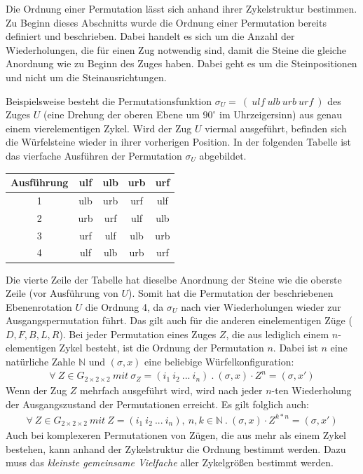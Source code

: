 \documentclass[12pt,a4paper, usenames, dvipsnames]{article}
\theoremstyle{mystyle}
\theoremstyle{definition}
\newcommand{\Gtwo}{\ensuremath{G_{2\times 2\times 2}}}
\begin{document}
Die Ordnung einer Permutation lässt sich anhand ihrer Zykelstruktur bestimmen. Zu Beginn dieses Abschnitts wurde die Ordnung einer Permutation bereits definiert und beschrieben. Dabei handelt es sich um die Anzahl der Wiederholungen, die für einen Zug notwendig sind, damit die Steine die gleiche Anordnung wie zu Beginn des Zuges haben. Dabei geht es um die Steinpositionen und nicht um die Steinausrichtungen.

Beispielsweise besteht die Permutationsfunktion $\sigma_U =\ ( \ \textit{ulf} \ \textit{ulb} \ \textit{urb} \ \textit{urf} \ ) $  des Zuges $U$ (eine Drehung der oberen Ebene um $90^\circ$ im Uhrzeigersinn) aus genau einem vierelementigen Zykel.
Wird der Zug $U$ viermal ausgeführt, befinden sich die Würfelsteine wieder in ihrer vorherigen Position. In der folgenden Tabelle ist das vierfache Ausführen der Permutation $\sigma_U$ abgebildet.
\begin{center}
\begin{tabular}{ccccc}
\toprule
\textbf{Ausführung} & \textbf{ulf} & \textbf{ulb} & \textbf{urb} & \textbf{urf} \\
\midrule
1 & ulb & urb & urf & ulf \\

2 & urb & urf & ulf & ulb \\

3 & urf & ulf & ulb & urb \\

4 & ulf & ulb & urb & urf \\
\bottomrule
\end{tabular}
\end{center}

Die vierte Zeile der Tabelle hat dieselbe Anordnung der Steine wie die oberste Zeile (vor Ausführung von $U$). 
Somit hat die Permutation der beschriebenen Ebenenrotation $U$ die Ordnung 4, da $\sigma_U$ nach vier Wiederholungen wieder zur Ausgangspermutation führt. Das gilt auch für die anderen einelementigen Züge ($D, F, B, L, R$).
Bei jeder Permutation eines Zuges $Z$, die aus lediglich einem $n$-elementigen Zykel besteht, ist die Ordnung der Permutation $n$. Dabei ist $n$ eine natürliche Zahle $\mathbb{N}$ und $(\sigma, x)$ eine beliebige Würfelkonfiguration:
\begin{align*}
\forall \ Z \in \Gtwo \ \textit{mit} \ \sigma_Z=(i_1 \ i_2 \ ... \ i_n) \ . \  (\sigma, x) \cdot Z^n= (\sigma, x')
\end{align*}
Wenn der Zug $Z$ mehrfach ausgeführt wird, wird nach jeder $n$-ten Wiederholung der Ausgangszustand der Permutationen erreicht. \cite{TD} 
Es gilt folglich auch:
\begin{align*}
\forall \ Z \in \Gtwo \ \textit{mit} \ Z=(i_1 \ i_2 \ ... \ i_n), \ n,k \in \mathbb{N} \ . \  {(\sigma, x) \cdot Z^{k*n}=(\sigma, x') }
\end{align*}
Auch bei komplexeren Permutationen von Zügen, die aus mehr als einem Zykel bestehen, kann anhand der Zykelstruktur die Ordnung bestimmt werden. Dazu muss das \textit{kleinste gemeinsame Vielfache} aller Zykelgrößen bestimmt werden. \cite{TD}
\end{document}

